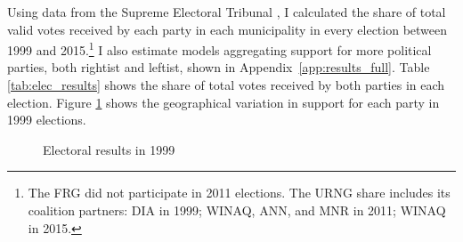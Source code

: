 \documentclass[12pt, notitlepage]{article}
\begin{document}
Using data from the Supreme Electoral Tribunal \citep{TSE:2019aa}, I calculated the share of total valid votes received by each party in each municipality in every election between 1999 and 2015.\footnote{The FRG did not participate in 2011 elections. The URNG share includes its coalition partners: DIA in 1999; WINAQ, ANN, and MNR in 2011; WINAQ in 2015.}
I also estimate models aggregating support for more political parties, both rightist and leftist, shown in Appendix~\ref{app:results_full}.
Table \ref{tab:elec_results} shows the share of total votes received by both parties in each election.
Figure \ref{fig:map_elec1999} shows the geographical variation in support for each party in 1999 elections.

\begin{figure}[!ht]
    \centering

    \begin{minipage}{1\textwidth}
      \centering
      \hspace{25pt}
    \end{minipage}

    \caption{Electoral results in 1999}\label{fig:map_elec1999}

\end{figure}
\end{document}
